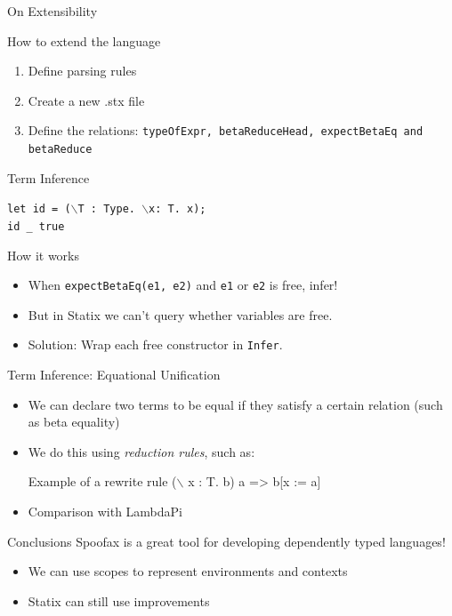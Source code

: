 \documentclass[aspectratio=43]{beamer}
\begin{document}
\begin{frame}{On Extensibility}
	\begin{block}{How to extend the language}
		\begin{enumerate}
			\item Define parsing rules
			\item Create a new .stx file
			\item Define the relations: \texttt{typeOfExpr, betaReduceHead, expectBetaEq and betaReduce}
		\end{enumerate}
	\end{block}
\end{frame}

\begin{frame}{Term Inference}
	\begin{example}\texttt{let id = ($\backslash$T : Type. $\backslash$x: T. x);
	\\id \_ true}
	\end{example}
	\begin{block}{How it works}
		\begin{itemize}
			\item When \texttt{expectBetaEq(e1, e2)} and \texttt{e1} or \texttt{e2} is free, infer!
			\item But in Statix we can't query whether variables are free.
			\item Solution: Wrap each free constructor in \texttt{Infer}.
		\end{itemize}
	\end{block}
\end{frame}

\begin{frame}{Term Inference: Equational Unification}
	\begin{itemize}
		\item We can declare two terms to be equal if they satisfy a certain relation (such as beta equality)
		\item We do this using \emph{reduction rules}, such as:
		\begin{exampleblock}{Example of a rewrite rule}
			($\backslash$ x : T. b) a => b[x := a]
		\end{exampleblock}
		\item Comparison with LambdaPi
	\end{itemize}
\end{frame}

\begin{frame}[fragile]{Conclusions}
	Spoofax is a great tool for developing dependently typed languages!
	\begin{itemize}
		\item We can use scopes to represent environments and contexts
		\item Statix can still use improvements
	\end{itemize}
	
\end{frame}

\end{document}
